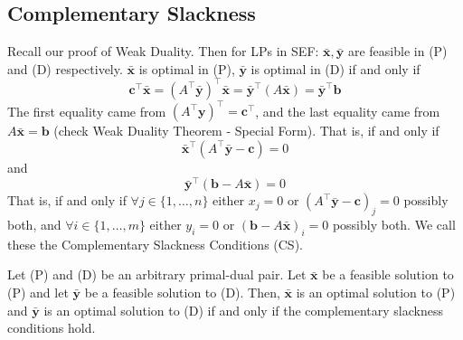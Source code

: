 \subsection{Complementary Slackness}
Recall our proof of Weak Duality. Then for LPs in SEF:
$ \bm{\bar{x}}, \bm{\bar{y}} $ are feasible in (P) and (D) respectively.
$ \bm{\bar{x}} $ is optimal in (P), $ \bm{\bar{y}} $ is optimal in
(D)  if and only if
\[ \bm{c} ^\top \bm{\bar{x}}=(A^\top \bm{\bar{y}})^\top \bm{\bar{x}}=\bm{\bar{y}}^\top(A \bm{\bar{x}})=
    \bm{\bar{y}}^\top \bm{b} \]
The first equality came from $ (A ^\top \bm{y})^\top=\bm{c}^\top $, and the
last equality came from $ A \bm{\bar{x}}=\bm{b} $ (check Weak Duality Theorem -
Special Form).
That is, if and only if
\[ \bm{\bar{x}}^\top(A ^\top \bm{\bar{y}}-\bm{c})=0 \]
and
\[ \bm{\bar{y}}^\top(\bm{b}-A \bm{\bar{x}})=0 \]
That is, if and only if $ \forall j\in \{1,\ldots,n\} $ either
$ x_j=0 $ or $ (A ^\top \bm{\bar{y}}-\bm{c})_j=0 $ possibly
both, and $ \forall i\in \{1,\ldots,m\} $ either $ y_i=0 $
or $ (\bm{b}-A \bm{\bar{x}})_i=0 $ possibly both. We call these
the Complementary Slackness Conditions (CS).

\begin{thmbox}
    \begin{theorem}
        Let (P) and (D) be an arbitrary primal-dual pair. Let
        $ \bm{\bar{x}} $ be a feasible solution to (P) and let
        $ \bm{\bar{y}} $ be a feasible solution to (D). Then,
        $ \bm{\bar{x}} $ is an optimal solution to (P) and
        $ \bm{\bar{y}} $ is an optimal solution to (D) if and only if
        the complementary slackness conditions hold.
    \end{theorem}
\end{thmbox}

